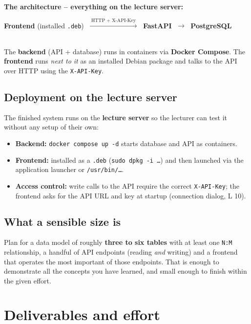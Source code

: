 \documentclass[11pt,a4paper]{article}
\begin{document}
\begin{beispielbox}
\textbf{The architecture -- everything on the lecture server:}\\[6pt]
\centerline{%
  \textbf{Frontend} (installed \texttt{.deb})
  $\;\xrightarrow{\;\text{HTTP + X-API-Key}\;}\;$
  \textbf{FastAPI}
  $\;\longrightarrow\;$ \textbf{PostgreSQL}%
}\\[6pt]
The \textbf{backend} (API + database) runs in containers via \textbf{Docker
Compose}. The \textbf{frontend} runs \emph{next to it} as an installed Debian
package and talks to the API over HTTP using the \texttt{X-API-Key}.
\end{beispielbox}

\subsection{Deployment on the lecture server}

The finished system runs on the \textbf{lecture server} so the lecturer can test
it without any setup of their own:

\begin{itemize}[leftmargin=1.4em]
  \item \textbf{Backend:} \texttt{docker compose up -d} starts database and API
        as containers.
  \item \textbf{Frontend:} installed as a \texttt{.deb}
        (\texttt{sudo dpkg -i \dots}) and then launched via the application
        launcher or \texttt{/usr/bin/\dots}.
  \item \textbf{Access control:} write calls to the API require the correct
        \texttt{X-API-Key}; the frontend asks for the API URL and key at startup
        (connection dialog, L 10).
\end{itemize}

\subsection{What a sensible size is}

Plan for a data model of roughly \textbf{three to six tables} with at least one
\texttt{N:M} relationship, a handful of API endpoints (reading \emph{and}
writing) and a frontend that operates the most important of those endpoints.
That is enough to demonstrate all the concepts you have learned, and small
enough to finish within the given effort.

\section{Deliverables and effort}
\end{document}
